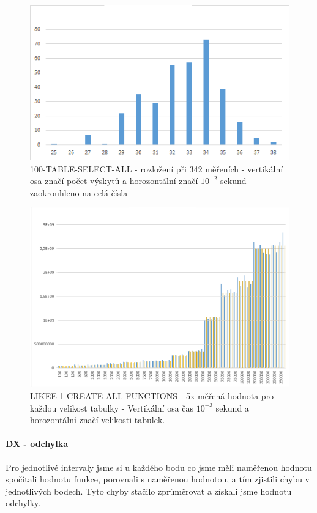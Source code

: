 \documentclass[a4paper, 11pt]{article}
\begin{document}
\begin{figure}[H]
\centering
\includegraphics[width=150mm, frame]{images/100-TABLE-SELECT-ALL-342.png}
\caption{100-TABLE-SELECT-ALL - rozložení při 342 měřeních - vertikální osa značí počet výskytů a horozontální značí $10^{-2}$ sekund zaokrouhleno na celá čísla}
\label{sec:obr3}
\end{figure}

\begin{figure}[H]
\centering
\includegraphics[width=150mm, frame]{images/LIKEE-1-CREATE-ALL-FUNCTIONS.png}
\caption{LIKEE-1-CREATE-ALL-FUNCTIONS - 5x měřená hodnota pro každou velikost tabulky - Vertikální osa čas $10^{-3}$ sekund a horozontální značí velikosti tabulek.}
\label{sec:obr2}
\end{figure}

\paragraph{DX - odchylka} Pro jednotlivé intervaly jsme si u každého bodu co jsme měli naměřenou hodnotu spočítali hodnotu funkce, porovnali s naměřenou hodnotou, a tím zjistili chybu v jednotlivých bodech. Tyto chyby stačilo zprůměrovat a získali jsme hodnotu odchylky. 
\end{document}
